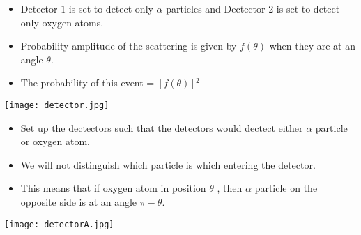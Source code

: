 \documentclass[aspectratio=169]{beamer}
\begin{document}
\begin{frame}

	\begin{multicols}{2}

		\begin{itemize}
			\item Detector $ 1 $ is set to detect only $ \alpha $ particles and Dectector  $ 2 $ is set to detect only oxygen atoms.\newline
			\item Probability amplitude of the scattering is given by $ f(\theta)$ when they are at an angle $\theta$.\newline
			\item The probability of this event = $ \,\Bigr\rvert\,f(\theta) \,\Bigr\rvert\,^{2} $
		\end{itemize}
		
	\columnbreak

\texttt{[image: detector.jpg]} 

	\end{multicols}


\end{frame}


\begin{frame}{}

	\begin{multicols}{2}
 
 		\begin{itemize}
	
			\item Set up the dectectors such that the detectors would dectect either $\alpha$ particle or oxygen atom.\newline
			\item We will not distinguish which particle is which entering the detector.\newline
			\item This means that if oxygen atom in position $\theta$ , then
		$\alpha$ particle on the opposite side is at an angle $\pi-\theta$.
		
		\end{itemize}
	
	\columnbreak
	
		\texttt{[image: detectorA.jpg]} 
	
	\end{multicols}
	
		
\end{frame}
\end{document}

